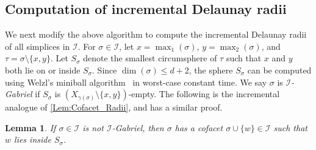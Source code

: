 \documentclass[11pt]{amsart}
\newcommand{\deff}{\emph}
\newcommand{\Incr}[0]{\mathcal{I}}
\theoremstyle{plain}
\newtheorem{lemma}[theorem]{Lemma}
\theoremstyle{definition}
\theoremstyle{remark}
\begin{document}
\subsection{Computation of incremental Delaunay radii}
We next modify the above algorithm to compute the incremental Delaunay radii of
all simplices in $\Incr$.  For $\sigma \in \Incr$, let  $x=\max_1(\sigma)$,
$y=\max_2(\sigma)$, and $\tau=\sigma \setminus \{x, y\}$.  Let $S_{\sigma}$
denote the smallest circumsphere of $\tau$ such that $x$ and $y$ both lie on or
inside $S_{\sigma}$.  Since $\dim(\sigma)\leq d+2$, the sphere $S_{\sigma}$ can be computed using Welzl's
miniball algorithm~\cite{welzlSmallestEnclosingDisks1991} in worst-case constant time.  We say $\sigma$ is \deff{$\Incr$-Gabriel} if $S_{\sigma}$ is
$(X_{\gamma(\sigma)}\setminus \{x,y\})$-empty.  
%
The following is the incremental analogue of \cref{Lem:Cofacet_Radii}, and has a similar proof.
%
\begin{lemma}\label{Lem:Incremental_cofacet}
If $\sigma \in \Incr$ is not $\Incr$-Gabriel, then $\sigma$ has a cofacet $\sigma \cup \{w\} \in \Incr$ such that $w$ lies inside $S_{\sigma}$.  
\end{lemma}
%
\end{document}
